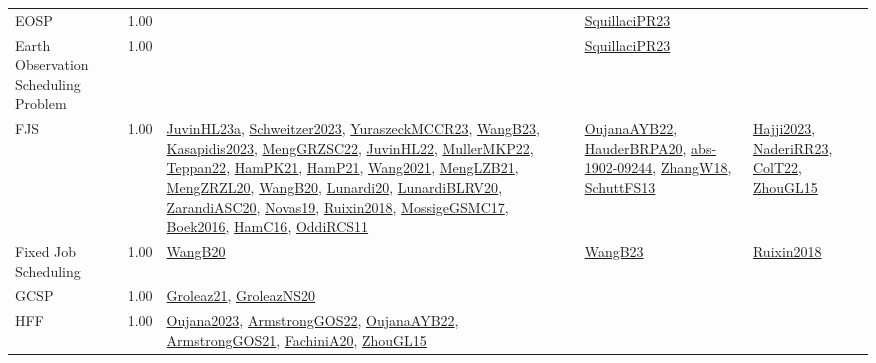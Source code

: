 {\begin{longtable}{p{3cm}r>{\raggedright\arraybackslash}p{6cm}>{\raggedright\arraybackslash}p{6cm}>{\raggedright\arraybackslash}p{8cm}}
\index{EOSP}\index{Classification!EOSP}EOSP &  1.00 &  & \hyperref[detail:SquillaciPR23]{SquillaciPR23} & \\
\index{Earth Observation Scheduling Problem}\index{Classification!Earth Observation Scheduling Problem}Earth Observation Scheduling Problem &  1.00 &  & \hyperref[detail:SquillaciPR23]{SquillaciPR23} & \\
\index{FJS}\index{Classification!FJS}FJS &  1.00 & \hyperref[detail:JuvinHL23a]{JuvinHL23a}, \hyperref[detail:Schweitzer2023]{Schweitzer2023}, \hyperref[detail:YuraszeckMCCR23]{YuraszeckMCCR23}, \hyperref[detail:WangB23]{WangB23}, \hyperref[detail:Kasapidis2023]{Kasapidis2023}, \hyperref[detail:MengGRZSC22]{MengGRZSC22}, \hyperref[detail:JuvinHL22]{JuvinHL22}, \hyperref[detail:MullerMKP22]{MullerMKP22}, \hyperref[detail:Teppan22]{Teppan22}, \hyperref[detail:HamPK21]{HamPK21}, \hyperref[detail:HamP21]{HamP21}, \hyperref[detail:Wang2021]{Wang2021}, \hyperref[detail:MengLZB21]{MengLZB21}, \hyperref[detail:MengZRZL20]{MengZRZL20}, \hyperref[detail:WangB20]{WangB20}, \hyperref[detail:Lunardi20]{Lunardi20}, \hyperref[detail:LunardiBLRV20]{LunardiBLRV20}, \hyperref[detail:ZarandiASC20]{ZarandiASC20}, \hyperref[detail:Novas19]{Novas19}, \hyperref[detail:Ruixin2018]{Ruixin2018}, \hyperref[detail:MossigeGSMC17]{MossigeGSMC17}, \hyperref[detail:Boek2016]{Boek2016}, \hyperref[detail:HamC16]{HamC16}, \hyperref[detail:OddiRCS11]{OddiRCS11} & \hyperref[detail:OujanaAYB22]{OujanaAYB22}, \hyperref[detail:HauderBRPA20]{HauderBRPA20}, \hyperref[detail:abs-1902-09244]{abs-1902-09244}, \hyperref[detail:ZhangW18]{ZhangW18}, \hyperref[detail:SchuttFS13]{SchuttFS13} & \hyperref[detail:Hajji2023]{Hajji2023}, \hyperref[detail:NaderiRR23]{NaderiRR23}, \hyperref[detail:ColT22]{ColT22}, \hyperref[detail:ZhouGL15]{ZhouGL15}\\
\index{Fixed Job Scheduling}\index{Classification!Fixed Job Scheduling}Fixed Job Scheduling &  1.00 & \hyperref[detail:WangB20]{WangB20} & \hyperref[detail:WangB23]{WangB23} & \hyperref[detail:Ruixin2018]{Ruixin2018}\\
\index{GCSP}\index{Classification!GCSP}GCSP &  1.00 & \hyperref[detail:Groleaz21]{Groleaz21}, \hyperref[detail:GroleazNS20]{GroleazNS20} &  & \\
\index{HFF}\index{Classification!HFF}HFF &  1.00 & \hyperref[detail:Oujana2023]{Oujana2023}, \hyperref[detail:ArmstrongGOS22]{ArmstrongGOS22}, \hyperref[detail:OujanaAYB22]{OujanaAYB22}, \hyperref[detail:ArmstrongGOS21]{ArmstrongGOS21}, \hyperref[detail:FachiniA20]{FachiniA20}, \hyperref[detail:ZhouGL15]{ZhouGL15} &  & \\

\end{longtable}}
